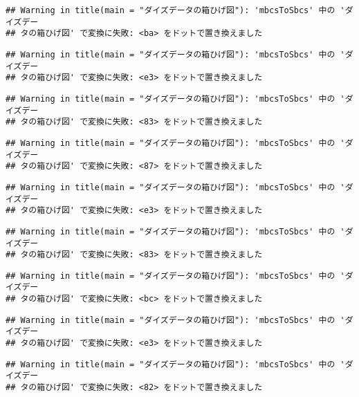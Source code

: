 \documentclass[
]{article}
\begin{document}
\begin{verbatim}
## Warning in title(main = "ダイズデータの箱ひげ図"): 'mbcsToSbcs' 中の 'ダイズデー
## タの箱ひげ図' で変換に失敗: <ba> をドットで置き換えました
\end{verbatim}

\begin{verbatim}
## Warning in title(main = "ダイズデータの箱ひげ図"): 'mbcsToSbcs' 中の 'ダイズデー
## タの箱ひげ図' で変換に失敗: <e3> をドットで置き換えました
\end{verbatim}

\begin{verbatim}
## Warning in title(main = "ダイズデータの箱ひげ図"): 'mbcsToSbcs' 中の 'ダイズデー
## タの箱ひげ図' で変換に失敗: <83> をドットで置き換えました
\end{verbatim}

\begin{verbatim}
## Warning in title(main = "ダイズデータの箱ひげ図"): 'mbcsToSbcs' 中の 'ダイズデー
## タの箱ひげ図' で変換に失敗: <87> をドットで置き換えました
\end{verbatim}

\begin{verbatim}
## Warning in title(main = "ダイズデータの箱ひげ図"): 'mbcsToSbcs' 中の 'ダイズデー
## タの箱ひげ図' で変換に失敗: <e3> をドットで置き換えました
\end{verbatim}

\begin{verbatim}
## Warning in title(main = "ダイズデータの箱ひげ図"): 'mbcsToSbcs' 中の 'ダイズデー
## タの箱ひげ図' で変換に失敗: <83> をドットで置き換えました
\end{verbatim}

\begin{verbatim}
## Warning in title(main = "ダイズデータの箱ひげ図"): 'mbcsToSbcs' 中の 'ダイズデー
## タの箱ひげ図' で変換に失敗: <bc> をドットで置き換えました
\end{verbatim}

\begin{verbatim}
## Warning in title(main = "ダイズデータの箱ひげ図"): 'mbcsToSbcs' 中の 'ダイズデー
## タの箱ひげ図' で変換に失敗: <e3> をドットで置き換えました
\end{verbatim}

\begin{verbatim}
## Warning in title(main = "ダイズデータの箱ひげ図"): 'mbcsToSbcs' 中の 'ダイズデー
## タの箱ひげ図' で変換に失敗: <82> をドットで置き換えました
\end{verbatim}
\end{document}
